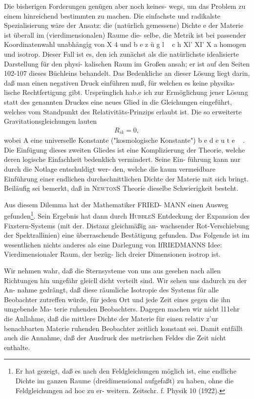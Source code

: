 Die bisherigen Forderungen genügen aber noch keines-
wegs, um das Problem zu einem hinreichend bestimmten
zu machen. Die einfachste und radikalste Spezialisierung
wäre der Ansatz: die (natürlich gemessene) Dichte e der
Materie ist überall im (vierdimensionalen) Raume die-
selbe, die Metrik ist bei passender Koordinatenwahl
unabhängig von X 4 und
b
e
z
ü
g
l
~
c
h
Xl' XI' X a homogen
und isotrop. Dieser Fall ist es, den ich zunächst als
die natürlichste idealisierte Darstellung für den physi-
kalischen Raum im Großen ansah; er ist auf den Seiten
102-107 dieses Büchleins behandelt. Das Bedenkliche
an dieser Lösung liegt darin, daß man einen negativen
Druck einführen muß, für welchen es keine physika-
lische Rechtfertigung gibt. Ursprünglich hab.e ich zur
Ermöglichung jener Lösung statt des genannten Druckes
eine neues Glied in die Gleichungen eingeführt, welches
vom Standpunkt des Relativitäts-Prinzips erlaubt ist.
Die so erweiterte Gravitationsgleichungen lauten
\begin{align}
    R_{ik} = 0,
\end{align}
wobei A eine universelle Konstante ("kosmologische
Konstante")
b
e
d
e
u
t
e
~
.
Die Einfügung dieses zweiten
Gliedes ist eine Komplizierung der Theorie, welche deren
logische Einfachheit bedenklich vermindert. Seine Ein-
führung kann nur durch die Notlage entschuldigt wer-
den, welche die kaum vermeidbare Einführung einer
endlichen durchschnittlichen Dichte der Materie mit
sich bringt. Beiläufig sei bemerkt, daß in \textsc{Newton}S
Theorie dieselbe Schwierigkeit besteht.

Aus diesem Dilemma hat der Mathematiker FRIED-
MANN einen Ausweg gefunden\footnote{Er hat gezeigt, daß es nach den Feldgleichungen möglich
ist, eine endliche Dichte im ganzen Raume (dreidimensional
aufgefaßt) zu haben, ohne die Feldgleichungen ad hoc zu er-
weitern. Zeitschr. f. Physik 10 (1922).}. Sein Ergebnis hat
dann durch \textsc{Hubble}S Entdeckung der Expansion des
Fixstern-Systems (mit der. Distanz gleichmäßig an-
wachsender Rot-Verschiebung der Spektrallinien) eine
überraschende Bestätigung gefunden. Das Folgende ist
im wesentlichen nichts anderes als eine Darlegung von
IfRIEDMANNS Idee: Vierdimensionaler Raum, der bezüg-
lich dreier Dimensionen isotrop ist.

Wir nehmen wahr, daß die Sternsysteme von uns
aus gesehen nach allen Richtungen hin ungefähr gleicll
dicht verteilt sind. Wir sehen uns dadurch zu der An-
nahme gedrängt, daß diese räumliche Isotropie des
Systems für alle Beobachter zutreffen würde, für jeden
Ort und jede Zeit eines gegen die ihn umgebende Ma-
terie ruhenden Beobachters. Dagegen machen wir nicht
l11ehr die Anllahme, daß die mittlere Dichte der Materie
für einen relativ z'ur benachbarten Materie ruhenden
Beobachter zeitlich konstant sei. Damit entfällt auch
die Annahme, daß der Ausdruck des metrischen Feldes
die Zeit nicht enthalte.

